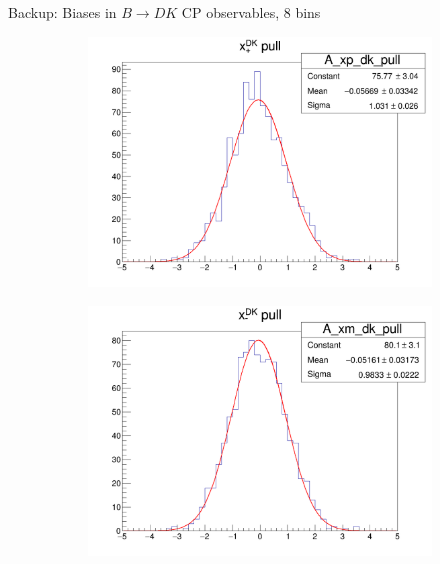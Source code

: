 \documentclass{beamer}
\begin{document}
\begin{frame}{Backup: Biases in $B\to DK$ CP observables, $8$ bins}
  \begin{figure}
    \centering
    \vspace{-0.2cm}
    \begin{subfigure}{0.42\textwidth}
      \includegraphics[width = 1.0\textwidth]{A_xp_dk_8Bins_pull.png}
    \end{subfigure}%
    \begin{subfigure}{0.42\textwidth}
      \includegraphics[width = 1.0\textwidth]{A_xm_dk_8Bins_pull.png}
    \end{subfigure}
    \begin{subfigure}{0.42\textwidth}

\end{subfigure}
\end{figure}
\end{frame}
\end{document}
